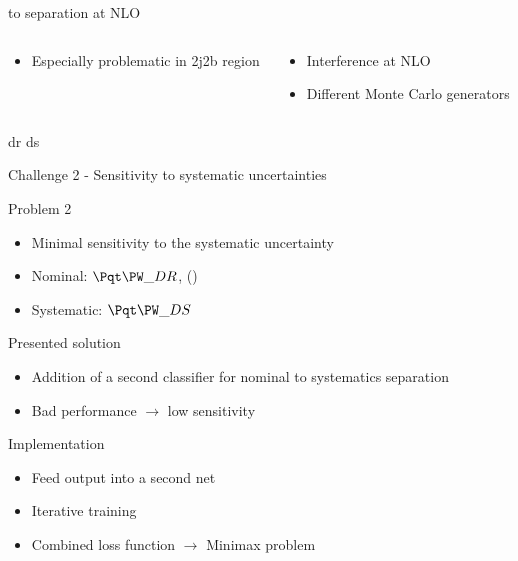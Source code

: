 \begin{frame}{\tW to \ttbar separation at NLO}
\begin{columns}
\begin{column}{0.45\textwidth}
\begin{itemize}
\item Especially problematic in 2j2b region
\end{itemize}
    \end{column}
    \quad
    \begin{column}{0.45\textwidth}
\begin{itemize}
\item Interference at NLO
\item Different Monte Carlo generators
\end{itemize}
    \end{column}
\quad
\end{columns}
\end{frame}

\begin{frame}{dr ds}

\end{frame}


\begin{frame}{Challenge 2 - Sensitivity to systematic uncertainties}
\begin{block}{Problem 2}
    \begin{itemize}
        \item Minimal sensitivity to the systematic uncertainty
        \item Nominal: $\tW\_DR$, (\ttbar)
        \item Systematic: $\tW\_DS$
    \end{itemize}
\end{block}
\begin{block}{Presented solution}
   \begin{itemize}
       \item Addition of a second classifier for nominal to systematics separation
       \item Bad performance $\longrightarrow$ low sensitivity
   \end{itemize}
\end{block}
\begin{block}{Implementation}
    \begin{itemize}
        \item Feed output into a second net
        \item Iterative training
        \item Combined loss function $\longrightarrow$ Minimax problem
    \end{itemize}
\end{block}
\end{frame}

